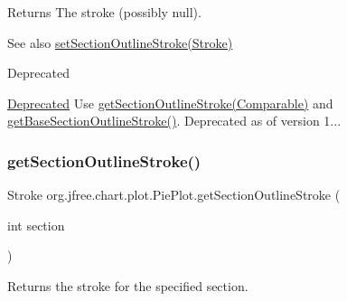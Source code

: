 \begin{DoxyReturn}{Returns}
The stroke (possibly {\ttfamily null}).
\end{DoxyReturn}
\begin{DoxySeeAlso}{See also}
\mbox{\hyperlink{classorg_1_1jfree_1_1chart_1_1plot_1_1_pie_plot_adc66765328e7ab87744e3d0cfbc84611}{set\+Section\+Outline\+Stroke(\+Stroke)}}
\end{DoxySeeAlso}
\begin{DoxyRefDesc}{Deprecated}
\item[\mbox{\hyperlink{deprecated__deprecated000074}{Deprecated}}]Use \mbox{\hyperlink{classorg_1_1jfree_1_1chart_1_1plot_1_1_pie_plot_a5a568c273b4e925fd3c93647b806a9b9}{get\+Section\+Outline\+Stroke(\+Comparable)}} and \mbox{\hyperlink{classorg_1_1jfree_1_1chart_1_1plot_1_1_pie_plot_a30e131b03d74d18e60d06e69f4219df0}{get\+Base\+Section\+Outline\+Stroke()}}. Deprecated as of version 1... \end{DoxyRefDesc}
\mbox{\label{classorg_1_1jfree_1_1chart_1_1plot_1_1_pie_plot_a334be36253108e12b90a70e0ab4066be}} 
\subsubsection{\texorpdfstring{get\+Section\+Outline\+Stroke()}{getSectionOutlineStroke()}\hspace{0.1cm}{\footnotesize\ttfamily [3/3]}}
{\footnotesize\ttfamily Stroke org.\+jfree.\+chart.\+plot.\+Pie\+Plot.\+get\+Section\+Outline\+Stroke (\begin{DoxyParamCaption}\item[{int}]{section }\end{DoxyParamCaption})}

Returns the stroke for the specified section.


